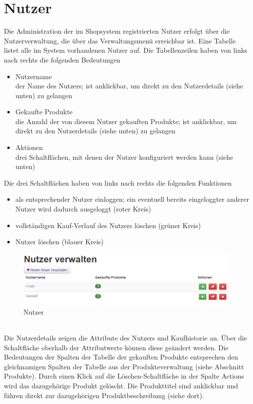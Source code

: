 \section{Nutzer}
Die Administration der im Shopsystem registrierten Nutzer erfolgt über die Nutzerverwaltung, die über das Verwaltungsmenü erreichbar ist. Eine Tabelle listet alle im System vorhandenen Nutzer auf. Die Tabellenzeilen haben von links nach rechts die folgenden Bedeutungen
\begin{itemize}
  \item Nutzername \\
        der Name des Nutzers; ist anklickbar, um direkt zu den  Nutzerdetails (siehe unten) zu gelangen
  \vspace*{-0.5em}
  \item Gekaufte Produkte \\
        die Anzahl der von diesem Nutzer gekauften Produkte; ist anklickbar, um direkt zu den Nutzerdetails (siehe unten) zu gelangen
  \vspace*{-0.5em}
  \item Aktionen \\
        drei Schaltflächen, mit denen der Nutzer konfiguriert werden kann (siehe unten)
\end{itemize}
Die drei Schaltflächen haben von links nach rechts die folgenden Funktionen
\begin{itemize}
  \item als entsprechender Nutzer einloggen; ein eventuell bereits eingeloggter anderer Nutzer wird dadurch ausgeloggt (roter Kreis)
  \vspace*{-0.5em}
  \item vollständigen Kauf-Verlauf des Nutzers löschen (grüner Kreis)
  \vspace*{-0.5em}
  \item Nutzer löschen (blauer Kreis)
\end{itemize}

\begin{figure}[h!]
  \centering
  \includegraphics[width=\textwidth]{UserManual/Nutzer.png}
  \caption{Nutzer}
  \label{fig:Nutzer}
\end{figure}
\text{}\vspace*{-1em}\\
Die Nutzerdetails zeigen die Attribute des Nutzers und Kaufhistorie an. Über die Schaltfläche oberhalb der Attributwerte können diese geändert werden. Die Bedeutungen der Spalten der Tabelle der gekauften Produkte entsprechen den gleichnamigen Spalten der Tabelle aus der Produkteverwaltung (siehe Abschnitt Produkte). Durch einen Klick auf die Löschen-Schaltfläche in der Spalte Actions wird das dazugehörige Produkt gelöscht.  Die Produkttitel sind anklickbar und führen direkt zur dazugehörigen Produktbeschreibung (siehe dort).

